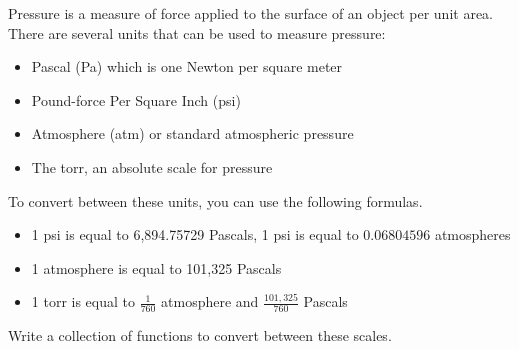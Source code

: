 \begin{exer}
\label{exercise:functions:pressure}
Pressure is a measure of force applied to the surface of an object 
per unit area.  There are several units that can be used to measure 
pressure:
\begin{itemize}
  \item Pascal (Pa) which is one Newton per square meter
  \item Pound-force Per Square Inch (psi) 
  \item Atmosphere (atm) or standard atmospheric pressure
  \item The torr, an absolute scale for pressure
\end{itemize}

To convert between these units, you can use the following formulas.
\begin{itemize}
  \item 1 psi is equal to 6,894.75729 Pascals, 1 psi is equal to $0.06804596$ atmospheres
  \item 1 atmosphere is equal to 101,325 Pascals
  \item 1 torr is equal to $\frac{1}{760}$ atmosphere and $\frac{101,325}{760}$ Pascals
\end{itemize}
Write a collection of functions to convert between these scales.
\end{exer}



